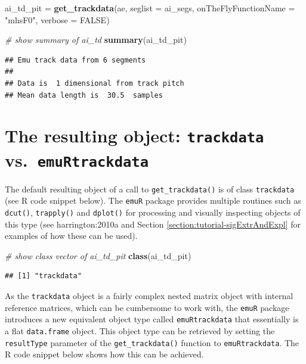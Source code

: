 \documentclass[]{book}
\newenvironment{Shaded}{\begin{snugshade}}{\end{snugshade}}
\newcommand{\CommentTok}[1]{\textcolor[rgb]{0.56,0.35,0.01}{\textit{#1}}}
\newcommand{\DataTypeTok}[1]{\textcolor[rgb]{0.13,0.29,0.53}{#1}}
\newcommand{\KeywordTok}[1]{\textcolor[rgb]{0.13,0.29,0.53}{\textbf{#1}}}
\newcommand{\NormalTok}[1]{#1}
\newcommand{\OtherTok}[1]{\textcolor[rgb]{0.56,0.35,0.01}{#1}}
\newcommand{\StringTok}[1]{\textcolor[rgb]{0.31,0.60,0.02}{#1}}
\begin{document}
\begin{Shaded}
\begin{Highlighting}[]
\NormalTok{ai_td_pit =}\StringTok{ }\KeywordTok{get_trackdata}\NormalTok{(ae,}
                          \DataTypeTok{seglist =}\NormalTok{ ai_segs,}
                          \DataTypeTok{onTheFlyFunctionName =} \StringTok{"mhsF0"}\NormalTok{,}
                          \DataTypeTok{verbose =} \OtherTok{FALSE}\NormalTok{)}

\CommentTok{# show summary of ai_td}
\KeywordTok{summary}\NormalTok{(ai_td_pit)}
\end{Highlighting}
\end{Shaded}

\begin{verbatim}
## Emu track data from 6 segments
## 
## Data is  1 dimensional from track pitch 
## Mean data length is  30.5  samples
\end{verbatim}

\hypertarget{the-resulting-object-trackdata-vs.-emurtrackdata}{%
\section{\texorpdfstring{The resulting object: \texttt{trackdata} vs.~\texttt{emuRtrackdata}}{The resulting object: trackdata vs.~emuRtrackdata}}\label{the-resulting-object-trackdata-vs.-emurtrackdata}}

The default resulting object of a call to \texttt{get\_trackdata()} is of class \texttt{trackdata} (see R code snippet below). The \texttt{emuR} package provides multiple routines such as \texttt{dcut()}, \texttt{trapply()} and \texttt{dplot()} for processing and visually inspecting objects of this type (see harrington:2010a and Section \ref{section:tutorial-sigExtrAndExpl} for examples of how these can be used).

\begin{Shaded}
\begin{Highlighting}[]
\CommentTok{# show class vector of ai_td_pit}
\KeywordTok{class}\NormalTok{(ai_td_pit)}
\end{Highlighting}
\end{Shaded}

\begin{verbatim}
## [1] "trackdata"
\end{verbatim}

As the \texttt{trackdata} object is a fairly complex nested matrix object with internal reference matrices, which can be cumbersome to work with, the \texttt{emuR} package introduces a new equivalent object type called \texttt{emuRtrackdata} that essentially is a flat \texttt{data.frame} object. This object type can be retrieved by setting the \texttt{resultType} parameter of the \texttt{get\_trackdata()} function to \texttt{emuRtrackdata}. The R code snippet below shows how this can be achieved.
\end{document}

